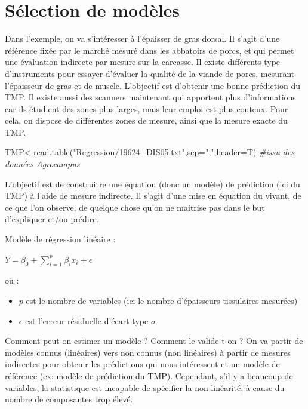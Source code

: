 \documentclass[
]{article}
\newenvironment{Shaded}{\begin{snugshade}}{\end{snugshade}}
\newcommand{\AttributeTok}[1]{\textcolor[rgb]{0.77,0.63,0.00}{#1}}
\newcommand{\CommentTok}[1]{\textcolor[rgb]{0.56,0.35,0.01}{\textit{#1}}}
\newcommand{\FunctionTok}[1]{\textcolor[rgb]{0.00,0.00,0.00}{#1}}
\newcommand{\NormalTok}[1]{#1}
\newcommand{\OtherTok}[1]{\textcolor[rgb]{0.56,0.35,0.01}{#1}}
\newcommand{\StringTok}[1]{\textcolor[rgb]{0.31,0.60,0.02}{#1}}
\begin{document}
\hypertarget{suxe9lection-de-moduxe8les}{%
\section{Sélection de modèles}\label{suxe9lection-de-moduxe8les}}

Dans l'exemple, on va s'intéresser à l'épaisser de gras dorsal. Il
s'agit d'une référence fixée par le marché mesuré dans les abbatoirs de
porcs, et qui permet une évaluation indirecte par mesure sur la
carcasse. Il existe différents type d'instruments pour essayer d'évaluer
la qualité de la viande de porcs, mesurant l'épaisseur de gras et de
muscle. L'objectif est d'obtenir une bonne prédiction du TMP. Il existe
aussi des scanners maintenant qui apportent plus d'informations car ils
étudient des zones plus larges, mais leur emploi est plus couteux. Pour
cela, on dispose de différentes zones de mesure, ainsi que la mesure
exacte du TMP.

\begin{Shaded}
\begin{Highlighting}[]
\NormalTok{TMP}\OtherTok{\textless{}{-}}\FunctionTok{read.table}\NormalTok{(}\StringTok{"Regression/19624\_DIS05.txt"}\NormalTok{,}\AttributeTok{sep=}\StringTok{","}\NormalTok{,}\AttributeTok{header=}\NormalTok{T) }\CommentTok{\#issu des données Agrocampus}
\end{Highlighting}
\end{Shaded}

L'objectif est de construitre une équation (donc un modèle) de
prédiction (ici du TMP) à l'aide de mesure indirecte. Il s'agit d'une
mise en équation du vivant, de ce que l'on observe, de quelque chose
qu'on ne maitrise pas dans le but d'expliquer et/ou prédire.

Modèle de régression linéaire :

\begin{center}
$Y =\beta_{0}+\sum_{i=1}^{p}\beta_{i}x_{i}+\epsilon$
\end{center}

où :

\begin{itemize}
\item
  \(p\) est le nombre de variables (ici le nombre d'épaisseurs
  tissulaires mesurées)
\item
  \(\epsilon\) est l'erreur résiduelle d'écart-type \(\sigma\)
\end{itemize}

Comment peut-on estimer un modèle ? Comment le valide-t-on ? On va
partir de modèles connus (linéaires) vers non connus (non linéaires) à
partir de mesures indirectes pour obtenir les prédictions qui nous
intéressent et un modèle de référence (ex: modèle de prédiction du TMP).
Cependant, s'il y a beaucoup de variables, la statistique est incapable
de spécifier la non-linéarité, à cause du nombre de composantes trop
élevé.
\end{document}
